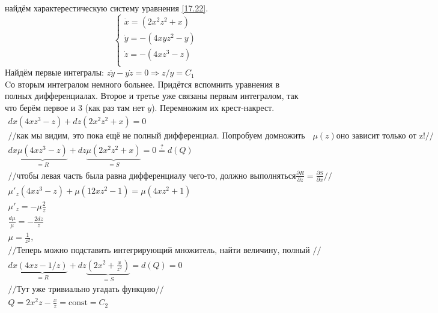 \documentclass{article}
\begin{document}
найдём характерестическую систему уравнения \ref{17.22}.
\begin{equation*}
    \begin{cases}
        \dot x =\left(2 x^{2} z^{2}+x\right) \\
        \dot y = -\left(4 x y z^{2}-y\right)\\
        \dot z =-\left(4 x z^{3}-z\right) \\
    \end{cases}
\end{equation*}
Найдём первые интегралы:
$z \dot y -  y\dot z=0 \Rightarrow z/y=C_1$\\
Cо вторым интегралом немного больнее. Придётся вспомнить уравнения в полных дифференциалах. Второе и третье уже связаны первым интегралом, так что берём первое и 3 (как раз там нет $y$). Перемножим их крест-накрест.
\begin{gather*}
    dx(4xz^3-z)+dz(2x^2z^2+x)=0\\
    //\text{как мы видим, это пока ещё не полный дифференциал. Попробуем домножить на} \mu(z) \text{оно зависит только от z!} //\\
    dx \underbrace{\mu(4xz^3-z)}_{=R} + dz \underbrace{\mu (2x^2z^2+x)}_{=S} = 0 \stackrel{?}{=} d(Q)\\
    //\text{чтобы левая часть была равна дифференциалу чего-то, должно выполняться} \frac{\partial R}{\partial z} = \frac{\partial S}{\partial x}  //\\
    \mu'_z(4xz^3-z)+\mu(12xz^2-1)=\mu(4xz^2+1)\\
    \mu'_z=-\mu \frac{2}{z}\\    
    \frac{d \mu}{\mu}=-\frac{2 dz}{z}\\
    \mu = \frac{1}{z^2}, \\
    //\text{Теперь можно подставить интегрирующий множитель, найти величину, полный дифференциал который ноль}//\\
    dx \underbrace{(4xz-1/z)}_{=R} + dz \underbrace{(2x^2+\frac{x}{z^2})}_{=S} = d(Q)=0\\
    //\text{Тут уже тривиально угадать функцию}//\\
    Q=2x^2z- \frac{x}{z} = \text{const} = C_2
\end{gather*}
\end{document}

